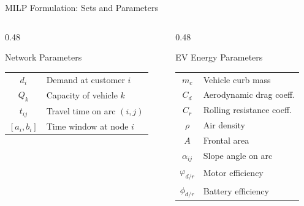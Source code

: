 \documentclass[aspectratio=169,11pt]{beamer}
\begin{document}
\begin{frame}{MILP Formulation: Sets and Parameters}
\begin{columns}[T]
\begin{column}{0.48\textwidth}
            \vspace{0.3cm}
            \begin{block}{Network Parameters}
                \begin{tabular}{cl}
                    $d_i$ & Demand at customer $i$ \\
                    $Q_k$ & Capacity of vehicle $k$ \\
                    $t_{ij}$ & Travel time on arc $(i,j)$ \\
                    $[a_i, b_i]$ & Time window at node $i$
                \end{tabular}
            \end{block}
        \end{column}
        \begin{column}{0.48\textwidth}
            \begin{block}{EV Energy Parameters}
                \begin{tabular}{cl}
                    $m_c$ & Vehicle curb mass \\
                    $C_d$ & Aerodynamic drag coeff. \\
                    $C_r$ & Rolling resistance coeff. \\
                    $\rho$ & Air density \\
                    $A$ & Frontal area \\
                    $\alpha_{ij}$ & Slope angle on arc \\
                    $\varphi_{d/r}$ & Motor efficiency \\
                    $\phi_{d/r}$ & Battery efficiency
                \end{tabular}
            \end{block}
        \end{column}
    \end{columns}
\end{frame}
\end{document}
